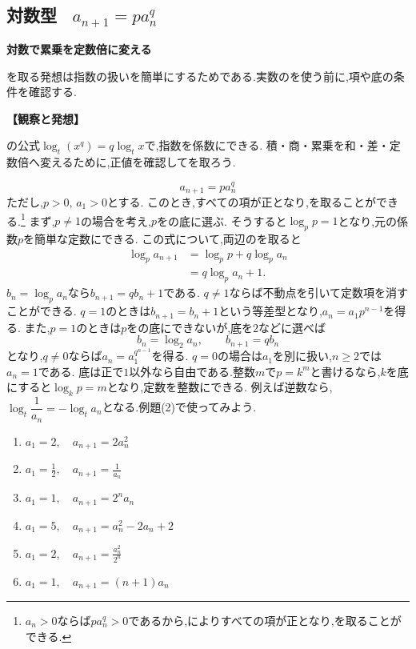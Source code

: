 
\subsection{\texorpdfstring{対数型 \, $a_{n+1}=pa_n^q$}{対数型}}\label{節：対数型}
  \begin{bookpoint}
    \textbf{対数で累乗を定数倍に変える}\par
    を取る発想は指数の扱いを簡単にするためである.実数のを使う前に,項や底の条件を確認する.
  \end{bookpoint}
  \noindent\textbf{【観察と発想】}\par
  の公式$\log_t(x^q)=q\log_t x$で,指数を係数にできる.
  積・商・累乗を和・差・定数倍へ変えるために,正値を確認してを取ろう.

  \[
    a_{n+1}=pa_n^q
  \]
  ただし,$p>0,\,a_1>0$とする. このとき,すべての項が正となり,を取ることができる.\footnote{$a_n>0$ならば$p a_n^q>0$であるから,によりすべての項が正となり,を取ることができる.}
  まず,$p\ne1$の場合を考え,$p$をの底に選ぶ.
  そうすると$\log_pp=1$となり,元の係数$p$を簡単な定数にできる.
  この式について,両辺のを取ると
  \[
    \begin{aligned}
      \log_pa_{n+1}&=\log_pp+q\log_pa_n\\
                  &=q\log_pa_n+1.
    \end{aligned}
  \]
  $b_n=\log_pa_n$なら$b_{n+1}=qb_n+1$である.
  $q\ne1$ならば不動点を引いて定数項を消すことができる.
  $q=1$のときは$b_{n+1}=b_n+1$という等差型となり,$a_n=a_1p^{n-1}$を得る.
  また,$p=1$のときは$p$をの底にできないが,底を$2$などに選べば
  \[
    b_n=\log_2a_n,\qquad b_{n+1}=qb_n
  \]
  となり,$q\ne0$ならば$a_n=a_1^{q^{n-1}}$を得る.
  $q=0$の場合は$a_1$を別に扱い,$n\ge2$では$a_n=1$である.
  底は正で$1$以外なら自由である.整数$m$で$p=k^m$と書けるなら,$k$を底にすると$\log_kp=m$となり,定数を整数にできる.
  例えば逆数なら,$\log_t\dfrac{1}{a_n}=-\log_t a_n$となる.例題(2)で使ってみよう.

  \noindent{}\par\nobreak
  \begin{enumerate}[label=(\arabic*),parsep=3pt,format=\bookitemlink{example-logarithmic-1}{problem}{answer}]
    \item $\displaystyle a_1=2,\quad a_{n+1}=2a_n^2$
    \item $\displaystyle a_1=\frac{1}{2},\quad a_{n+1}=\frac{1}{a_n}$
    \item $\displaystyle a_1=1,\quad a_{n+1}=2^na_n$
    \item $\displaystyle a_1=5,\quad a_{n+1}=a_n^2-2a_n+2$
    \item $\displaystyle a_1=2,\quad a_{n+1}=\frac{a_n^2}{2^n}$
    \item $\displaystyle a_1=1,\quad a_{n+1}=(n+1)a_n$
  \end{enumerate}

